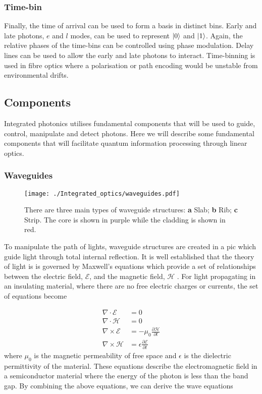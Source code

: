 \subsubsection*{Time-bin}

Finally, the time of arrival can be used to form a basis in distinct bins. Early and late photons, $e$ and $l$ modes, can be used to represent $\ket{0}$ and $\ket{1}$. Again, the relative phases of the time-bins can be controlled using phase modulation. Delay lines can be used to allow the early and late photons to interact. Time-binning is used in fibre optics where a polarisation or path encoding would be unstable from environmental drifts.

\subsection{Components}

Integrated photonics utilises fundamental components that will be used to guide, control, manipulate and detect photons. Here we will describe some fundamental components that will facilitate quantum information processing through linear optics.

\subsubsection*{Waveguides}

\begin{figure}[t]
	\centering
	\texttt{[image: ./Integrated\_optics/waveguides.pdf]}
	\caption[Main types of waveguide structures]{There are three main types of waveguide structures:  \textbf{a} Slab; \textbf{b} Rib; \textbf{c} Strip. The core is shown in purple while the cladding is shown in red.}
	\label{fig:waveguides}
\end{figure}

To manipulate the path of lights, waveguide structures are created in a \ac{pic} which guide light through total internal reflection. It is well established that the theory of light is is governed by Maxwell's equations which provide a set of relationships between the electric field, $\mathcal{E}$, and the magnetic field, $\mathcal{H}$ \cite{lifante2003integrated}. For light propagating in an insulating material, where there are no free electric charges or currents, the set of equations become

\begin{align}
	\nabla\cdot\mathcal{E} &= 0\\
	\nabla\cdot\mathcal{H} &= 0\\
	\nabla\times\mathcal{E} &= -\mu_0\frac{\partial\mathcal{H}}{\partial t}\\
	\nabla\times\mathcal{H} &= \epsilon\frac{\partial\mathcal{E}}{\partial t}
\end{align}
where $\mu_0$ is the magnetic permeability of free space and $\epsilon$ is the dielectric permittivity of the material. These equations describe the electromagnetic field in a semiconductor material where the energy of the photon is less than the band gap. By combining the above equations, we can derive the wave equations

